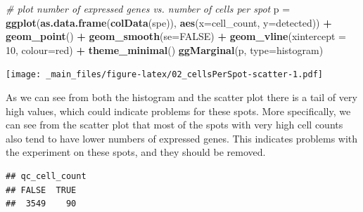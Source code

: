 \documentclass[
]{book}
\newenvironment{Shaded}{\begin{snugshade}}{\end{snugshade}}
\newcommand{\AttributeTok}[1]{\textcolor[rgb]{0.13,0.29,0.53}{#1}}
\newcommand{\CommentTok}[1]{\textcolor[rgb]{0.56,0.35,0.01}{\textit{#1}}}
\newcommand{\ConstantTok}[1]{\textcolor[rgb]{0.56,0.35,0.01}{#1}}
\newcommand{\DecValTok}[1]{\textcolor[rgb]{0.00,0.00,0.81}{#1}}
\newcommand{\DocumentationTok}[1]{\textcolor[rgb]{0.56,0.35,0.01}{\textbf{\textit{#1}}}}
\newcommand{\FunctionTok}[1]{\textcolor[rgb]{0.13,0.29,0.53}{\textbf{#1}}}
\newcommand{\NormalTok}[1]{#1}
\newcommand{\OtherTok}[1]{\textcolor[rgb]{0.56,0.35,0.01}{#1}}
\newcommand{\SpecialCharTok}[1]{\textcolor[rgb]{0.81,0.36,0.00}{\textbf{#1}}}
\newcommand{\StringTok}[1]{\textcolor[rgb]{0.31,0.60,0.02}{#1}}
\begin{document}
\begin{Shaded}
\begin{Highlighting}[]
\CommentTok{\# plot number of expressed genes vs. number of cells per spot}
\NormalTok{p }\OtherTok{=} \FunctionTok{ggplot}\NormalTok{(}\FunctionTok{as.data.frame}\NormalTok{(}\FunctionTok{colData}\NormalTok{(spe)), }\FunctionTok{aes}\NormalTok{(}\AttributeTok{x=}\NormalTok{cell\_count, }\AttributeTok{y=}\NormalTok{detected)) }\SpecialCharTok{+}
  \FunctionTok{geom\_point}\NormalTok{() }\SpecialCharTok{+} 
  \FunctionTok{geom\_smooth}\NormalTok{(}\AttributeTok{se=}\ConstantTok{FALSE}\NormalTok{) }\SpecialCharTok{+}
  \FunctionTok{geom\_vline}\NormalTok{(}\AttributeTok{xintercept =} \DecValTok{10}\NormalTok{, }\AttributeTok{colour=}\StringTok{\textquotesingle{}red\textquotesingle{}}\NormalTok{) }\SpecialCharTok{+} 
  \FunctionTok{theme\_minimal}\NormalTok{()}
\FunctionTok{ggMarginal}\NormalTok{(p, }\AttributeTok{type=}\StringTok{\textquotesingle{}histogram\textquotesingle{}}\NormalTok{)}
\end{Highlighting}
\end{Shaded}

\texttt{[image: \_main\_files/figure-latex/02\_cellsPerSpot-scatter-1.pdf]}

As we can see from both the histogram and the scatter plot there is a tail of very high values, which could indicate problems for these spots. More specifically, we can see from the scatter plot that most of the spots with very high cell counts also tend to have lower numbers of expressed genes. This indicates problems with the experiment on these spots, and they should be removed.

\begin{Shaded}
\end{Shaded}

\begin{verbatim}
## qc_cell_count
## FALSE  TRUE 
##  3549    90
\end{verbatim}

\begin{Shaded}
\end{Shaded}
\end{document}
